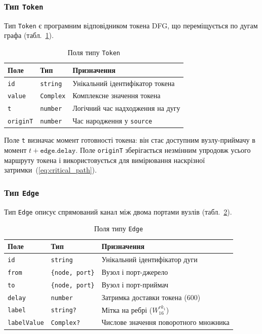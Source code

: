 \subsubsection*{Тип \texttt{Token}}

Тип \texttt{Token} є програмним відповідником токена DFG, що
переміщується по дугам графа (табл.~\ref{tab:token}).

\begin{table}[H]
  \caption{Поля типу \texttt{Token}}
  \label{tab:token}
  \centering
  \small
  \begin{tabular}{lll}
    \toprule
    Поле & Тип & Призначення \\
    \midrule
    \texttt{id}      & \texttt{string}               & Унікальний ідентифікатор токена \\
    \texttt{value}   & \texttt{Complex}              & Комплексне значення токена \\
    \texttt{t}       & \texttt{number}               & Логічний час надходження на дугу \\
    \texttt{originT} & \texttt{number}               & Час народження у \texttt{source} \\
    \bottomrule
  \end{tabular}
\end{table}

Поле \texttt{t} визначає момент готовності токена: він стає доступним
вузлу-приймачу в момент $t + \texttt{edge.delay}$. Поле
\texttt{originT} зберігається незмінним упродовж усього маршруту
токена і використовується для вимірювання наскрізної
затримки~(\ref{eq:critical_path}).

\subsubsection*{Тип \texttt{Edge}}

Тип \texttt{Edge} описує спрямований канал між двома портами
вузлів (табл.~\ref{tab:edge}).

\begin{table}[H]
  \caption{Поля типу \texttt{Edge}}
  \label{tab:edge}
  \centering
  \small
  \begin{tabular}{lll}
    \toprule
    Поле & Тип & Призначення \\
    \midrule
    \texttt{id}     & \texttt{string}                  & Унікальний ідентифікатор дуги \\
    \texttt{from}   & \texttt{\{node, port\}}          & Вузол і порт-джерело \\
    \texttt{to}     & \texttt{\{node, port\}}          & Вузол і порт-приймач \\
    \texttt{delay}  & \texttt{number}                  & Затримка доставки токена (600) \\
    \texttt{label}  & \texttt{string?}                 & Мітка на ребрі ($W_{16}^{rk_1}$) \\
    \texttt{labelValue} & \texttt{Complex?}            & Числове значення поворотного множника \\
    \bottomrule
  \end{tabular}
\end{table}

